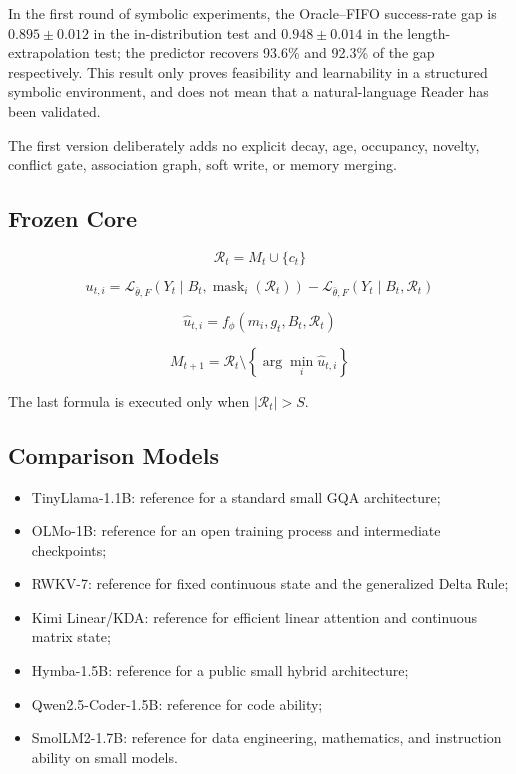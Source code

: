 In the first round of symbolic experiments, the Oracle--FIFO success-rate gap is $0.895\pm0.012$ in the in-distribution test and $0.948\pm0.014$ in the length-extrapolation test; the predictor recovers 93.6\% and 92.3\% of the gap respectively. This result only proves feasibility and learnability in a structured symbolic environment, and does not mean that a natural-language Reader has been validated.

The first version deliberately adds no explicit decay, age, occupancy, novelty, conflict gate, association graph, soft write, or memory merging.

\subsection{Frozen Core}

\[
\mathcal R_t=M_t\cup\{c_t\}
\]

\[
u_{t,i} =
\mathcal L_{\bar\theta,F}
\left(Y_t\mid B_t,\operatorname{mask}_i(\mathcal R_t)\right) -
\mathcal L_{\bar\theta,F}
\left(Y_t\mid B_t,\mathcal R_t\right)
\]

\[
\hat u_{t,i}=f_\phi(m_i,g_t,B_t,\mathcal R_t)
\]

\[
M_{t+1} =
\mathcal R_t\setminus
\left\{ \arg\min_i\hat u_{t,i}\right\}
\]

The last formula is executed only when $|\mathcal R_t| > S$.

\subsection{Comparison Models}

\begin{itemize}
  \item TinyLlama-1.1B: reference for a standard small GQA architecture;
  \item OLMo-1B: reference for an open training process and intermediate checkpoints;
  \item RWKV-7: reference for fixed continuous state and the generalized Delta Rule;
  \item Kimi Linear/KDA: reference for efficient linear attention and continuous matrix state;
  \item Hymba-1.5B: reference for a public small hybrid architecture;
  \item Qwen2.5-Coder-1.5B: reference for code ability;
  \item SmolLM2-1.7B: reference for data engineering, mathematics, and instruction ability on small models.
\end{itemize}

